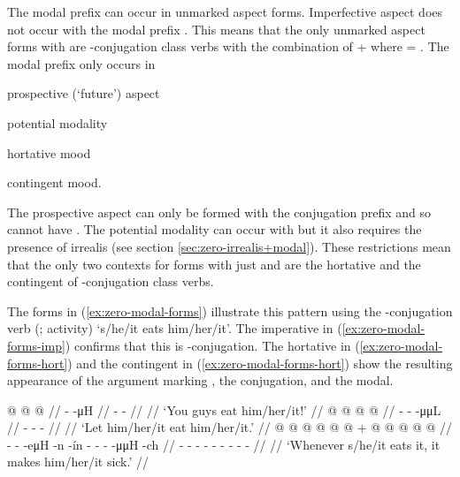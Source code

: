 \begin{multicols}{2}
\noindent
The modal prefix  can occur in unmarked aspect forms.
Imperfective aspect does not occur with the modal prefix .
This means that the only unmarked aspect forms with  are -conjugation class verbs with the combination of  +  where  = .
The  modal prefix only occurs in
\begin{inlineenum}
	\item	prospective (‘future’) aspect
	\item	potential modality
	\item	hortative mood
	\item	contingent mood.
\end{inlineenum}
The prospective aspect can only be formed with the  conjugation prefix and so cannot have .
The potential modality can occur with  but it also requires the presence of irrealis  (see section \ref{sec:zero-irrealis+modal}).
These restrictions mean that the only two contexts for forms with just  and  are the hortative and the contingent of -conjugation class verbs.

The forms in (\ref{ex:zero-modal-forms}) illustrate this pattern using the -conjugation verb  (;  activity) ‘s/he/it eats him/her/it’.
The imperative in (\ref{ex:zero-modal-forms-imp}) confirms that this is -conjugation.
The hortative in (\ref{ex:zero-modal-forms-hort}) and the contingent in (\ref{ex:zero-modal-forms-hort}) show the resulting appearance of the argument marking , the  conjugation, and the  modal.

\pex\label{ex:zero-modal-forms}%
\a\label{ex:zero-modal-forms-imp}%
%
\begingl
	\gla	{} @ {} @ {} @ {} //
	\glb	{} -  -μH //
	\glc	{}\· -  - //
	\gld	{} {} {} {} //
	\glft	‘You guys eat him/her/it!’
		//
\endgl
\a\label{ex:zero-modal-forms-hort}%
%
\begingl
	\gla	{} @ {} @ {} @ {} @ {} //
	\glb	{}-  -  -μμL //
	\glc	{}- \· -  - //
	\gld	{} {} {} {}  //
	\glft	‘Let him/her/it eat him/her/it.’
		//
\endgl
\a\label{ex:zero-modal-forms-ctng}%
%
\begingl
	\gla	{} @ {} @ {} @ {} @ {} @ {} @ {} +
		 @ {} @ {} @ {} @ {} @ {} //
	\glb	{}-  -  -eμH -n -ín
		- - -  -μμH -ch //
	\glc	{}- \· -  - - -
		- -   - - //
	\gld	{} {} {} {} {} {} {}
		 {} {} {} {} {} //
	\glft	‘Whenever s/he/it eats it, it makes him/her/it sick.’
		//
\endgl
\xe


\end{multicols}
